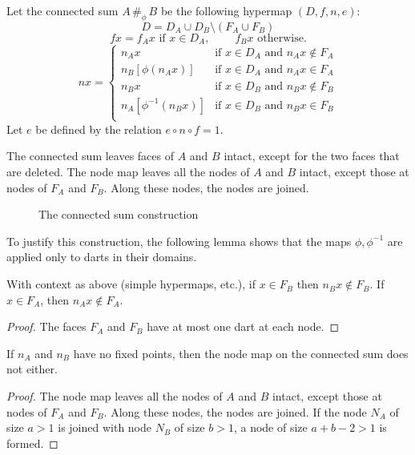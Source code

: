 \begin{definition} Let the connected sum
$A\,\#_\phi\, B$ be the following hypermap
$(D,f,n,e)$:
    $$D = D_A \cup D_B \setminus (F_A\cup F_B)$$
    $$f x = f_A x \text{\ if }  x\in D_A,\qquad \ f_B x
    \text{\ \ otherwise}.
    $$
    $$n x = \begin{cases}
    n_A x &
        \text{if }  x\in D_A \text{ and } n_A x\not\in F_A\\
    n_B[\phi(n_A x)] &
        \text{if }  x\in D_A \text{ and } n_A x\in F_A\\
    n_B x &
        \text{if }  x\in D_B \text{ and } n_B x\not\in F_B\\
    n_A[\phi^{-1}(n_B  x)] &
        \text{if }  x\in D_B \text{ and } n_B x\in F_B\\
    \end{cases}
    $$
Let $e$ be defined by the relation $e\circ n\circ f = 1$.
\end{definition}

The connected sum leaves faces of $A$ and $B$ intact,
except for the two faces that are deleted.  The node map
leaves all the nodes of $A$ and $B$ intact, except those
at nodes of $F_A$ and $F_B$.  Along these nodes, the nodes
are joined.



\begin{figure}[htb]
  \centering
  \caption{The connected sum construction}
  \label{fig:connected-sum}
\end{figure}


To justify this construction, the following lemma shows that the
maps $\phi,\phi^{-1}$ are applied only to darts in their domains.

\begin{lemma} With context as above (simple hypermaps, etc.),
if $x\in F_B$ then $n_B x\not\in F_B$.  If $x\in
F_A$, then $n_A x\not\in F_A$.
\end{lemma}

\begin{proof} The faces $F_A$ and $F_B$ have at most one
dart at each node.
\end{proof}

\begin{lemma} If $n_A$ and $n_B$ have no fixed points, then
    the node map on the connected sum does not either.
\end{lemma}

\begin{proof}  The node map leaves all the nodes of $A$ and $B$
intact, except those at nodes of $F_A$ and $F_B$.  Along these
nodes, the nodes are joined.  If the node $N_A$ of size $a>1$ is
joined with node $N_B$ of size $b>1$, a node of size $a+b-2>1$ is
formed.
\end{proof}

